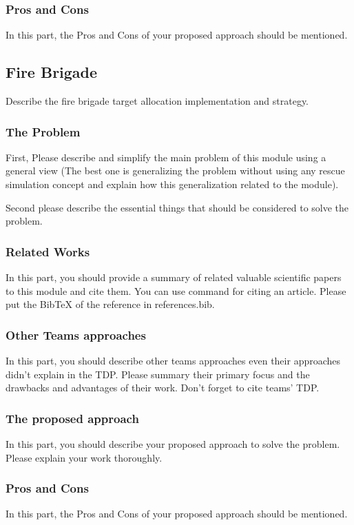 \documentclass[runningheads,a4paper]{llncs}
\begin{document}
\subsubsection{Pros and Cons}
In this part, the Pros and Cons of your proposed approach should be mentioned.

\subsection{Fire Brigade}
Describe the fire brigade target allocation implementation and strategy.
\subsubsection{The Problem}
First, Please describe and simplify the main problem of this module using a general view (The best one is generalizing the problem without using any rescue simulation concept and explain how this generalization related to the module).

Second please describe the essential things that should be considered to solve the problem.
\subsubsection{Related Works}
In this part, you should provide a summary of related valuable scientific papers to this module and cite them. You can use command \cite{ref1} for citing an article. Please put the BibTeX of the reference in references.bib.
\subsubsection{Other Teams approaches}
In this part, you should describe other teams approaches even their approaches didn't explain in the TDP. Please summary their primary focus and the drawbacks and advantages of their work. Don't forget to cite teams' TDP.
\subsubsection{The proposed approach}
In this part, you should describe your proposed approach to solve the problem. Please explain your work thoroughly.
\subsubsection{Pros and Cons}
In this part, the Pros and Cons of your proposed approach should be mentioned.
\end{document}
